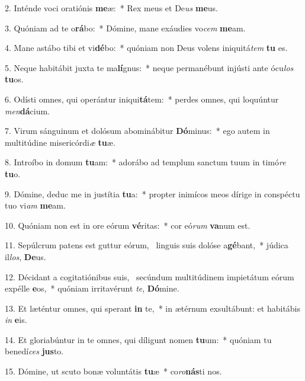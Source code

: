 2. Inténde voci oratiónis \textbf{me}æ:~*  Rex meus et De\textit{us} \textbf{me}us.\

3. Quóniam ad te o\textbf{rá}bo:~*  Dómine, mane exáudies vo\textit{cem} \textbf{me}am.\

4. Mane astábo tibi et vi\textbf{dé}bo:~*  quóniam non Deus volens iniquitá\textit{tem} \textbf{tu} es.\

5. Neque habitábit juxta te ma\textbf{lí}gnus:~*  neque permanébunt injústi ante ócu\textit{los} \textbf{tu}os.\

6. Odísti omnes, qui operántur iniqui\textbf{tá}tem:~*  perdes omnes, qui loquúntur \textit{men}\textbf{dá}cium.\

7. Virum sánguinum et dolósum abominábitur \textbf{Dó}minus:~*  ego autem in multitúdine misericórdi\textit{æ} \textbf{tu}æ.\

8. Introíbo in domum \textbf{tu}am:~*  adorábo ad templum sanctum tuum in timó\textit{re} \textbf{tu}o.\

9. Dómine, deduc me in justítia \textbf{tu}a:~*  propter inimícos meos dírige in conspéctu tuo vi\textit{am} \textbf{me}am.\

10. Quóniam non est in ore eórum \textbf{vé}ritas:~*  cor eó\textit{rum} \textbf{va}num est.\

11. Sepúlcrum patens est guttur eórum, \dag\  linguis suis dolóse a\textbf{gé}bant,~*  júdica il\textit{los}, \textbf{De}us.\

12. Décidant a cogitatiónibus suis, \dag\  secúndum multitúdinem impietátum eórum expélle \textbf{e}os,~*  quóniam irritavérunt \textit{te}, \textbf{Dó}mine.\

13. Et læténtur omnes, qui sperant \textbf{in} te,~*  in ætérnum exsultábunt: et habitábis \textit{in} \textbf{e}is.\

14. Et gloriabúntur in te omnes, qui díligunt nomen \textbf{tu}um:~*  quóniam tu benedí\textit{ces} \textbf{jus}to.\

15. Dómine, ut scuto bonæ voluntátis \textbf{tu}æ~*  co\textit{ro}\textbf{nás}ti nos.\

